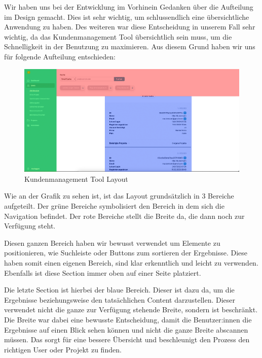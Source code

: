 Wir haben uns bei der Entwicklung im Vorhinein Gedanken über die Aufteilung im Design gemacht. Dies ist sehr wichtig, um schlussendlich eine übersichtliche Anwendung zu haben. Des weiteren war diese Entscheidung in unserem Fall sehr wichtig, da das Kundenmanagement Tool übersichtlich sein muss, um die Schnelligkeit in der Benutzung zu maximieren.
Aus diesem Grund haben wir uns für folgende Aufteilung entschieden:

\begin{figure}[h!]
    \centering
    \includegraphics[width=1\textwidth]{pics/planfred-grids.png}
    \caption{Kundenmanagement Tool Layout}
    \label{fig:mesh1}
\end{figure}

Wie an der Grafik zu sehen ist, ist das Layout grundsätzlich in 3 Bereiche aufgeteilt. Der grüne Bereiche symbolisiert den Bereich in dem sich die Navigation befindet. Der rote Bereiche stellt die Breite da, die dann noch zur Verfügung steht.

Diesen ganzen Bereich haben wir bewusst verwendet um Elemente zu positionieren, wie Suchleiste oder Buttons zum sortieren der Ergebnisse. Diese haben somit einen eigenen Bereich, sind klar erkenntlich und leicht zu verwenden. Ebenfalls ist diese Section immer oben auf einer Seite platziert.

Die letzte Section ist hierbei der blaue Bereich. Dieser ist dazu da, um die Ergebnisse beziehungsweise den tatsächlichen Content darzustellen. Dieser verwendet nicht die ganze zur Verfügung stehende Breite, sondern ist beschränkt. Die Breite war dabei eine bewusste Entscheidung, damit die Benutzer:innen die Ergebnisse auf einen Blick sehen können und nicht die ganze Breite abscannen müssen. Das sorgt für eine bessere Übersicht und beschleunigt den Prozess den richtigen User oder Projekt zu finden.

